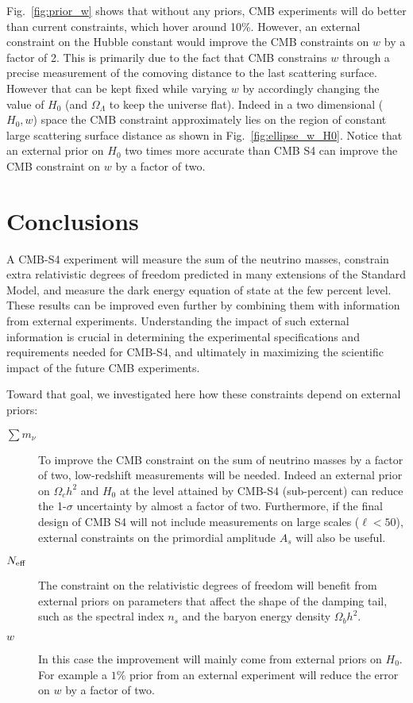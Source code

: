 \documentclass[aps,prd,reprint,superscriptaddress]{revtex4-1}
\newcommand{\reffig}[1]{Fig.~\ref{fig:#1}}
\begin{document}
\reffig{prior_w} shows that without any priors, CMB experiments will do better than current constraints, which hover around 10\%. However, an external constraint on the Hubble constant would improve the CMB constraints on $w$ by a factor of 2. 
This is primarily due to the fact that CMB constrains $w$ through a precise measurement of the comoving distance to the last scattering surface. However that can be kept fixed while varying $w$ by accordingly changing the value of $H_{0}$ (and $\Omega_{\Lambda}$ to keep the universe flat). Indeed in a two dimensional ($H_{0},w$) space the CMB constraint approximately lies on the region of constant large scattering surface distance as shown in \reffig{ellipse_w_H0}.
Notice that an external prior on $H_{0}$ two times more accurate than CMB S4 can improve the CMB constraint on $w$ by a factor of two.

\section{Conclusions \label{sec:conclusions}}
A CMB-S4 experiment will measure the sum of the neutrino masses, constrain extra relativistic degrees of freedom predicted in many extensions of the Standard Model, and measure the dark energy equation of state at the few percent level. 
These results can be improved even further by combining them with information from external experiments.
Understanding the impact of such external information is crucial in determining the experimental specifications and requirements needed for CMB-S4, and ultimately in maximizing the scientific impact of the future CMB experiments. 

Toward that goal, we investigated here how these constraints depend on external priors:
\begin{description}
\item[$\sum m_\nu$] To improve the CMB constraint on the sum of neutrino masses by a factor of two, low-redshift measurements will be needed. Indeed an external prior on $\Omega_{c}h^{2}$ and $H_{0}$ at the level attained by CMB-S4 (sub-percent) can reduce the 1-$\sigma$ uncertainty by almost a factor of two.
Furthermore, if the final design of CMB S4 will not include measurements on large scales ($\ell<50$), external constraints on the primordial amplitude $A_{s}$ will also be useful. 
\item[$N_{\rm eff}$] The constraint on the relativistic degrees of freedom will benefit from external priors on parameters that affect the shape of the damping tail, such as the spectral index $n_s$ and the baryon energy density $\Omega_b h^2$.
\item[$w$] In this case the improvement will mainly come from external priors on $H_{0}$. For example a $1\%$ prior from an external experiment will reduce the error on $w$ by a factor of two.\end{description}
\end{document}

